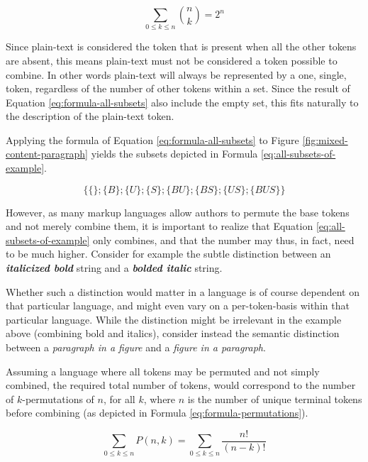 \documentclass{scrreprt}
\begin{document}
\begin{equation}
\sum_{0\leq{k}\leq{n}} {n \choose k} = 2^n
\label{eq:formula-all-subsets}
\end{equation}

Since plain-text is considered the token that is present when all the other tokens are absent, this means plain-text must not be considered a token possible to combine. In other words plain-text will always be represented by a one, single, token, regardless of the number of other tokens within a set. Since the result of Equation \ref{eq:formula-all-subsets} also include the empty set, this fits naturally to the description of the plain-text token.

Applying the formula of Equation \ref{eq:formula-all-subsets} to Figure \ref{fig:mixed-content-paragraph} yields the subsets depicted in Formula \ref{eq:all-subsets-of-example}.

\begin{equation}
\{\{\};\{B\};\{U\};\{S\};\{BU\};\{BS\};\{US\};\{BUS\}\}
\label{eq:all-subsets-of-example}
\end{equation}


However, as many markup languages allow authors to permute the base tokens and not merely combine them, it is important to realize that Equation \ref{eq:all-subsets-of-example} only combines, and that the number may thus, in fact, need to be much higher. Consider for example the subtle distinction between an \textit{\textbf{italicized bold}} string and a \textit{\textbf{bolded italic}} string.

Whether such a distinction would matter in a language is of course dependent on that particular language, and might even vary on a per-token-basis within that particular language. While the distinction might be irrelevant in the example above (combining bold and italics), consider instead the semantic distinction between a \emph{paragraph in a figure} and a \emph{figure in a paragraph}.

Assuming a language where all tokens may be permuted and not simply combined, the required total number of tokens, would correspond to the number of $k$-permutations of $n$, for all $k$, where $n$ is the number of unique terminal tokens before combining (as depicted in Formula \ref{eq:formula-permutations}).


\begin{equation}
\sum_{0\leq{k}\leq{n}} P(n,k) = 
\sum_{0\leq{k}\leq{n}} \frac{n!}{(n-k)!}
\label{eq:formula-permutations}
\end{equation}
\end{document}
